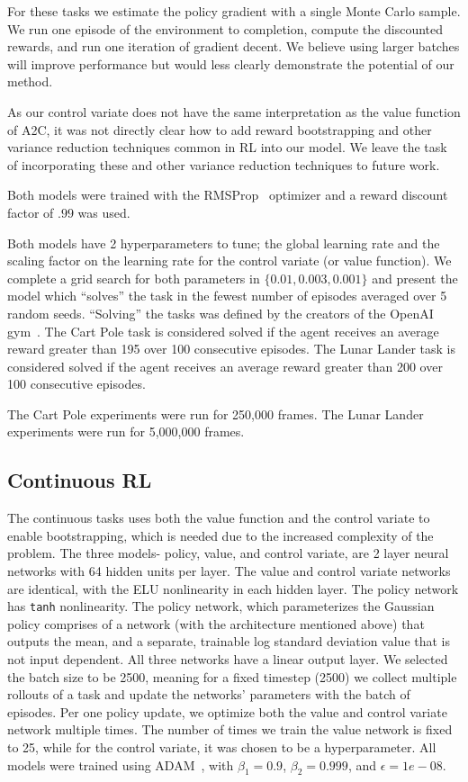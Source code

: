 \documentclass{article}
\begin{document}
For these tasks we estimate the policy gradient with a single Monte Carlo sample.
We run one episode of the environment to completion, compute the discounted rewards, and run one iteration of gradient decent.
We believe using larger batches will improve performance but would less clearly demonstrate the potential of our method. 

As our control variate does not have the same interpretation as the value function of A2C, it was not directly clear how to add reward bootstrapping and other variance reduction techniques common in RL into our model. We leave the task of incorporating these and other variance reduction techniques to future work.  

Both models were trained with the RMSProp~\citep{Tieleman2012} optimizer and a reward discount factor of $.99$ was used.

Both models have 2 hyperparameters to tune; the global learning rate and the scaling factor on the learning rate for the control variate (or value function).
We complete a grid search for both parameters in $\{0.01, 0.003, 0.001\}$ and present the model which ``solves'' the task in the fewest number of episodes averaged over 5 random seeds.
``Solving'' the tasks was defined by the creators of the OpenAI gym~\citep{1606.01540}.
The Cart Pole task is considered solved if the agent receives an average reward greater than 195 over 100 consecutive episodes.
The Lunar Lander task is considered solved if the agent receives an average reward greater than 200 over 100 consecutive episodes. 

The Cart Pole experiments were run for 250,000 frames.
The Lunar Lander experiments were run for 5,000,000 frames. 

\subsection{Continuous RL}
The continuous tasks uses both the value function and the control variate to enable bootstrapping, which is needed due to the increased complexity of the problem.
The three models- policy, value, and control variate, are 2 layer neural networks with 64 hidden units per layer.
The value and control variate networks are identical, with the ELU\citep{Clevert2016ELUs} nonlinearity in each hidden layer.
The policy network has \texttt{tanh} nonlinearity.
The policy network, which parameterizes the Gaussian policy comprises of a network (with the architecture mentioned above) that outputs the mean, and a separate, trainable log standard deviation value that is not input dependent.
All three networks have a linear output layer.
We selected the batch size to be 2500, meaning for a fixed timestep (2500) we collect multiple rollouts of a task and update the networks' parameters with the batch of episodes.
Per one policy update, we optimize both the value and control variate network multiple times.
The number of times we train  the value network is fixed to 25, while for the control variate, it was chosen to be a hyperparameter. 
All models were trained using ADAM~\citep{kingma2015adam}, with $\beta_1=0.9$, $\beta_2=0.999$, and $\epsilon=1e-08$. 
\end{document}
